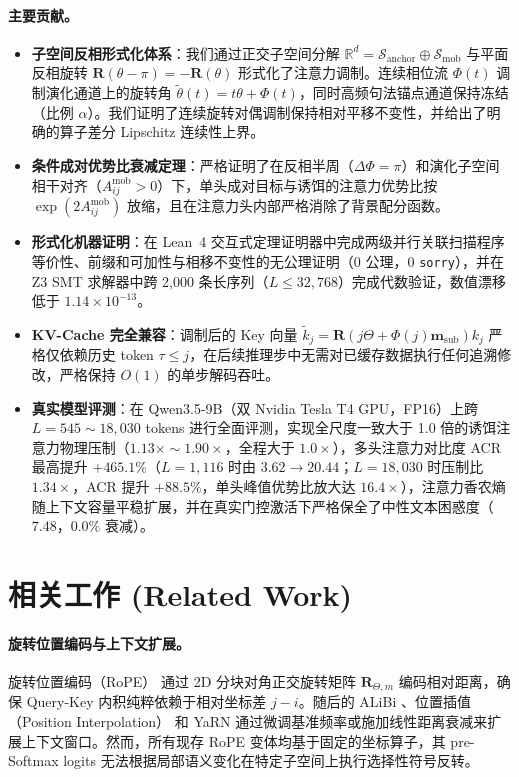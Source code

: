 \documentclass[11pt,a4paper]{article}
\theoremstyle{definition}
\begin{document}
\paragraph{主要贡献。}
\begin{itemize}
    \item \textbf{子空间反相形式化体系}：我们通过正交子空间分解 $\mathbb{R}^d = \mathcal{S}_{\text{anchor}} \oplus \mathcal{S}_{\text{mob}}$ 与平面反相旋转 $\mathbf{R}(\theta - \pi) = -\mathbf{R}(\theta)$ 形式化了注意力调制。连续相位流 $\Phi(t)$ 调制演化通道上的旋转角 $\tilde{\theta}(t) = t\theta + \Phi(t)$，同时高频句法锚点通道保持冻结（比例 $\alpha$）。我们证明了连续旋转对偶调制保持相对平移不变性，并给出了明确的算子差分 Lipschitz 连续性上界。
    \item \textbf{条件成对优势比衰减定理}：严格证明了在反相半周（$\Delta \Phi = \pi$）和演化子空间相干对齐（$A_{ij}^{\text{mob}} > 0$）下，单头成对目标与诱饵的注意力优势比按 $\exp(2 A_{ij}^{\text{mob}})$ 放缩，且在注意力头内部严格消除了背景配分函数。
    \item \textbf{形式化机器证明}：在 Lean~4 交互式定理证明器中完成两级并行关联扫描程序等价性、前缀和可加性与相移不变性的无公理证明（0 公理，0 \texttt{sorry}），并在 Z3 SMT 求解器中跨 2,000 条长序列（$L \le 32,768$）完成代数验证，数值漂移低于 $1.14 \times 10^{-13}$。
    \item \textbf{KV-Cache 完全兼容}：调制后的 Key 向量 $\tilde{k}_j = \mathbf{R}(j\Theta + \Phi(j)\mathbf{m}_{\text{sub}}) k_j$ 严格仅依赖历史 token $\tau \le j$，在后续推理步中无需对已缓存数据执行任何追溯修改，严格保持 $O(1)$ 的单步解码吞吐。
    \item \textbf{真实模型评测}：在 Qwen3.5-9B（双 Nvidia Tesla T4 GPU，FP16）上跨 $L=545 \sim 18,030$ tokens 进行全面评测，实现全尺度一致大于 1.0 倍的诱饵注意力物理压制（$1.13\times\sim 1.90\times$，全程大于 $1.0\times$），多头注意力对比度 ACR 最高提升 $+465.1\%$（$L=1,116$ 时由 $3.62\to 20.44$；$L=18,030$ 时压制比 $1.34\times$，ACR 提升 $+88.5\%$，单头峰值优势比放大达 $16.4\times$），注意力香农熵随上下文容量平稳扩展，并在真实门控激活下严格保全了中性文本困惑度（$7.48$，$0.0\%$ 衰减）。
\end{itemize}

\section{相关工作 (Related Work)}
\paragraph{旋转位置编码与上下文扩展。}
旋转位置编码（RoPE）\cite{su2024roformer} 通过 2D 分块对角正交旋转矩阵 $\mathbf{R}_{\Theta, m}$ 编码相对距离，确保 Query-Key 内积纯粹依赖于相对坐标差 $j - i$。随后的 ALiBi \cite{press2021train}、位置插值（Position Interpolation）\cite{chen2023extending} 和 YaRN \cite{peng2023yarn} 通过微调基准频率或施加线性距离衰减来扩展上下文窗口。然而，所有现存 RoPE 变体均基于固定的坐标算子，其 pre-Softmax logits 无法根据局部语义变化在特定子空间上执行选择性符号反转。
\end{document}
